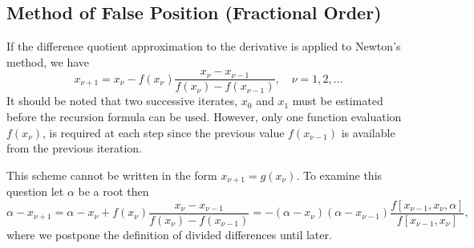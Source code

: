 \documentclass[../main.tex]{subfiles}
\begin{document}
\subsection{Method of False Position (Fractional Order)}
If the difference quotient approximation to the derivative is applied to Newton's method, we have
\begin{equation}
	x_{\nu+1} = x_\nu - f(x_\nu) \frac{x_\nu - x_{\nu-1}}{f(x_\nu) - f(x_{\nu-1})}, \quad \nu = 1, 2, \ldots
\end{equation}
It should be noted that two successive iterates, $x_0$ and $x_1$ must be estimated before the recursion formula can be used. However, only one function evaluation $f(x_\nu)$, is required at each step since the previous value $f(x_{\nu-1})$ is available from the previous iteration.

This scheme cannot be written in the form $x_{\nu+1} = g(x_\nu)$. To examine this question let $\alpha$ be a root then
\begin{equation}
	\alpha - x_{\nu+1} = \alpha - x_\nu + f(x_\nu) \frac{x_\nu - x_{\nu-1}}{f(x_\nu) - f(x_{\nu-1})} = -(\alpha - x_\nu) (\alpha - x_{\nu-1}) \frac{f[x_{\nu-1}, x_\nu, \alpha]}{f[x_{\nu-1}, x_\nu]},
\end{equation}
where we postpone the definition of divided differences until later.
\end{document}
